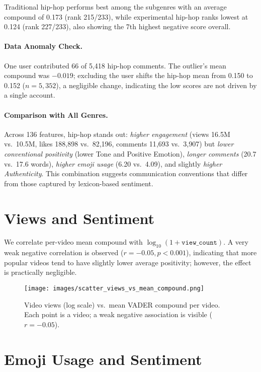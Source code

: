 Traditional hip-hop performs best among the subgenres with an average compound of 0.173
(rank 215/233), while experimental hip-hop ranks lowest at 0.124 (rank 227/233), also
showing the 7th highest negative score overall.

\paragraph{Data Anomaly Check.}
One user contributed 66 of 5{,}418 hip-hop comments. The outlier’s mean compound was $-0.019$;
excluding the user shifts the hip-hop mean from 0.150 to 0.152 ($n=5{,}352$), a negligible change,
indicating the low scores are not driven by a single account.

\paragraph{Comparison with All Genres.}
Across 136 features, hip-hop stands out:
\emph{higher engagement} (views 16.5M vs.\ 10.5M, likes 188{,}898 vs.\ 82{,}196, comments 11{,}693 vs.\ 3{,}907)
but \emph{lower conventional positivity} (lower Tone and Positive Emotion), \emph{longer comments}
(20.7 vs.\ 17.6 words), \emph{higher emoji usage} (6.20 vs.\ 4.09), and slightly \emph{higher Authenticity}.
This combination suggests communication conventions that differ from those captured by lexicon-based sentiment.

\section{Views and Sentiment}
\label{subsec:results_views}

We correlate per-video mean compound with $\log_{10}(1+\texttt{view\_count})$.
A very weak negative correlation is observed ($r = -0.05, p < 0.001$),
indicating that more popular videos tend to have slightly lower average positivity;
however, the effect is practically negligible.

\begin{figure}[H]
    \centering
    \texttt{[image: images/scatter\_views\_vs\_mean\_compound.png]}
    \caption{Video views (log scale) vs.\ mean VADER compound per video.
    Each point is a video; a weak negative association is visible ($r=-0.05$).}
    \label{fig:views_vs_compound}
\end{figure}

\section{Emoji Usage and Sentiment}
\label{subsec:results_emoji}

